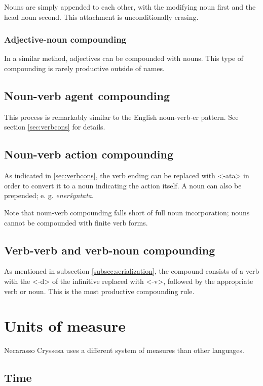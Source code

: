 \documentclass{book}
\begin{document}
Nouns are simply appended to each other, with the modifying noun first and the head noun second. This attachment is unconditionally erasing.

\subsection{Adjective-noun compounding}

In a similar method, adjectives can be compounded with nouns. This type of compounding is rarely productive outside of names.

\section{Noun-verb agent compounding}

This process is remarkably similar to the English noun-verb-er pattern. See section \ref{sec:verbcons} for details.

\section{Noun-verb action compounding}

As indicated in \ref{sec:verbcons}, the verb ending can be replaced with <-ata> in order to convert it to a noun indicating the action itself. A noun can also be prepended; e. g. \emph{eneršyntata}.

Note that noun-verb compounding falls short of full noun incorporation; nouns cannot be compounded with finite verb forms.

\section{Verb-verb and verb-noun compounding}

As mentioned in subsection \ref{subsec:serialization}, the compound consists of a verb with the <-d> of the infinitive replaced with <-v>, followed by the appropriate verb or noun. This is the most productive compounding rule.

\chapter{Units of measure}

Necarasso Cryssesa uses a different system of measures than other languages.

\section{Time}
\end{document}
